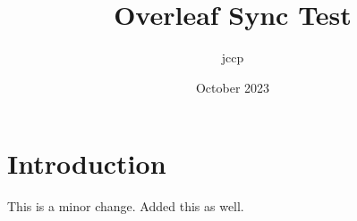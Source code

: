 \documentclass{article}
\title{Overleaf Sync Test}
\author{jccp }
\date{October 2023}
\begin{document}
\maketitle

\section{Introduction}

This is a minor change.
Added this as well.
\end{document}
